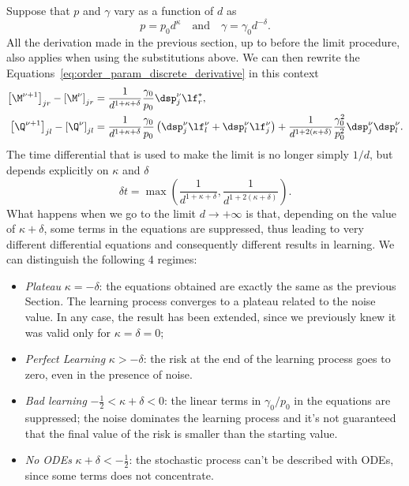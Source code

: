 Suppose that \(p\) and \(\gamma\) vary as a function of \(d\) as
\[p=p_0 d^\kappa\quad\text{and}\quad\gamma=\gamma_0d^{-\delta}.\]
All the derivation made in the previous section, up to before the limit procedure,
also applies when using the substitutions above. We can then rewrite the Equations~\eqref{eq:order_param_discrete_derivative}
in this context
\begin{subequations}\label{eq:order_param_discrete_derivative}\begin{align}
  \left[\M^{\nu+1}\right]_{jr} - \left[\M^{\nu}\right]_{jr} &= \frac{1}{d^{1+\kappa+\delta}}\frac{\gamma_0}{p_0} \dsp^\nu_j \lf_r^*,\\
  \left[\Q^{\nu+1}\right]_{jl} - \left[\Q^{\nu}\right]_{jl} &=
  \frac{1}{d^{1+\kappa+\delta}}\frac{\gamma_0}{p_0}\left(\dsp^\nu_j \lf_l^\nu + \dsp^\nu_l \lf_j^\nu\right) + \frac{1}{d^{1+2(\kappa+\delta)}}\frac{\gamma_0^2}{p_0^2} \dsp^\nu_j\dsp^\nu_l.
\end{align}\end{subequations}
The time differential that is used to make the limit is no longer simply \(1/d\),
but depends explicitly on \(\kappa\) and \(\delta\)
\[
  \delta t = \max\left(\frac{1}{d^{1+\kappa+\delta}}, \frac{1}{d^{1+2(\kappa+\delta)}}\right).
\]
What happens when we go to the limit \(d\to+\infty\) is that, depending on the value of \(\kappa+\delta\),
some terms in the equations are suppressed, thus leading to very different differential equations and consequently different results in learning.
We can distinguish the following 4 regimes:
\begin{itemize}
  \item \emph{Plateau} \(\kappa = -\delta\): the equations obtained are exactly the same as the previous Section.
        The learning process converges to a plateau related to the noise value.
        In any case, the result has been extended, since we previously knew it was valid only for \(\kappa=\delta=0\);
  \item \emph{Perfect Learning} \(\kappa > -\delta\): the risk at the end of the learning process goes to zero, even in the presence of noise.
  \item \emph{Bad learning} \(-\frac12<\kappa+\delta<0\): the linear terms in \(\gamma_0/p_0\) in the equations are suppressed;
        the noise dominates the learning process and it's not guaranteed that the final value of the risk is smaller than the starting value.
  \item \emph{No ODEs} \(\kappa+\delta<-\frac12\): the stochastic process can't be described with ODEs, since some terms does not concentrate.
\end{itemize}
